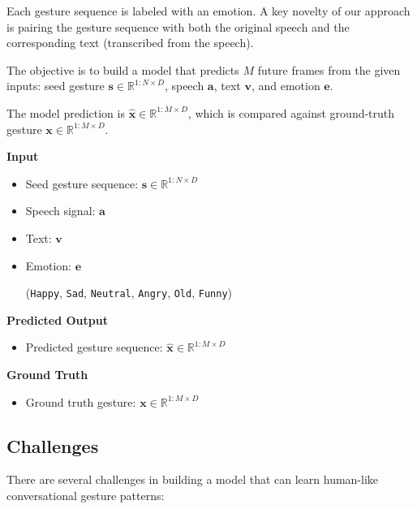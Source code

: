 Each gesture sequence is labeled with an emotion. A key novelty of our approach is pairing the gesture sequence with both the original speech and the corresponding text (transcribed from the speech).

The objective is to build a model that predicts $M$ future frames from the given inputs: seed gesture $\mathbf{s} \in \mathbb{R}^{1:N \times D}$, speech $\mathbf{a}$, text $\mathbf{v}$, and emotion $\mathbf{e}$.

The model prediction is $\hat{\mathbf{x}} \in \mathbb{R}^{1:M \times D}$, which is compared against ground-truth gesture $\mathbf{x} \in \mathbb{R}^{1:M \times D}$.

\begin{multicols}{2}
	
	\textbf{Input}
	
	\begin{itemize}
		\item Seed gesture sequence: $\mathbf{s} \in \mathbb{R}^{1:N \times D}$
		\item Speech signal: $\mathbf{a}$
		\item Text: $\mathbf{v}$
		\item Emotion: $\mathbf{e}$ 
		
		{\small
			(\texttt{Happy},  \texttt{Sad},  \texttt{Neutral}, \texttt{Angry}, \texttt{Old}, \texttt{Funny})
		}
	\end{itemize}
	
	\columnbreak
	
	\textbf{Predicted Output}
	\begin{itemize}
		\item Predicted gesture sequence:
		$\hat{\mathbf{x}} \in \mathbb{R}^{1:M \times D}$
	\end{itemize}
	
	\textbf{Ground Truth}
	\begin{itemize}
		\item Ground truth gesture: $ \mathbf{x}  \in \mathbb{R}^{1:M \times D}$
	\end{itemize}
	
\end{multicols}

\subsection{Challenges}
\label{sec:difficult}

There are several challenges in building a model that can learn human-like conversational gesture patterns:

